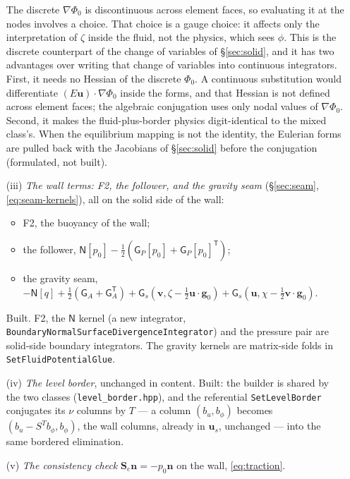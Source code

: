 \documentclass[11pt]{article}
\theoremstyle{definition}
\theoremstyle{remark}
\newcommand{\bu}{\mathbf{u}}
\newcommand{\bv}{\mathbf{v}}
\newcommand{\bn}{\mathbf{n}}
\newcommand{\code}[1]{\texttt{#1}}
\newcommand{\Se}{\mathbf{S}_e}
\begin{document}
\begin{enumerate}
  The discrete $\nabla\Phi_0$ is discontinuous across element faces,
  so evaluating it at the nodes involves a choice. That choice is a
  gauge choice: it affects only the interpretation of $\zeta$ inside
  the fluid, not the physics, which sees $\phi$. This is the discrete
  counterpart of the change of variables of \S\ref{sec:solid}, and it
  has two advantages over writing that change of variables into
  continuous integrators. First, it needs no Hessian of the discrete
  $\Phi_0$. A continuous substitution would differentiate
  $(E\bu)\cdot\nabla\Phi_0$ inside the forms, and that Hessian is not
  defined across element faces; the algebraic conjugation uses only
  nodal values of $\nabla\Phi_0$. Second, it makes the
  fluid-plus-border physics digit-identical to the mixed class's. When
  the equilibrium mapping is not the identity, the Eulerian forms are
  pulled back with the Jacobians of \S\ref{sec:solid} before the
  conjugation (formulated, not built).
\item[(iii)] \emph{The wall terms: F2, the follower, and the gravity
  seam} (\S\ref{sec:seam}, \eqref{eq:seam-kernels}), all on the solid
  side of the wall:
  \begin{itemize}
  \item F2, the buoyancy of the wall;
  \item the follower, $\mathsf N[p_0] - \tfrac12(\mathsf G_P[p_0] +
    \mathsf G_P[p_0]^{\mathsf T})$;
  \item the gravity seam, $-\mathsf N[q] + \tfrac12(\mathsf G_A +
    \mathsf G_A^{\mathsf T}) + \mathsf G_s(\bv, \zeta -
    \tfrac12\bu\cdot\mathbf g_0) + \mathsf G_s(\bu, \chi -
    \tfrac12\bv\cdot\mathbf g_0)$.
  \end{itemize}
  Built. F2, the $\mathsf N$ kernel (a new
  integrator,
  \code{BoundaryNormal\-SurfaceDivergence\-Integrator}) and the
  pressure pair are solid-side boundary integrators. The gravity
  kernels are matrix-side folds in \code{SetFluidPotentialGlue}.
\item[(iv)] \emph{The level border}, unchanged in content. Built: the
  builder is shared by the two classes (\code{level\_border.hpp}), and
  the referential \code{SetLevelBorder} conjugates its $\nu$ columns by
  $T$ — a column $(b_u, b_\phi)$ becomes $(b_u - S^T b_\phi, b_\phi)$,
  the wall columns, already in $\bu_s$, unchanged — into the same
  bordered elimination.
\item[(v)] \emph{The consistency check} $\Se\bn = -p_0\bn$ on the
  wall, \eqref{eq:traction}.
\end{enumerate}
\end{document}
